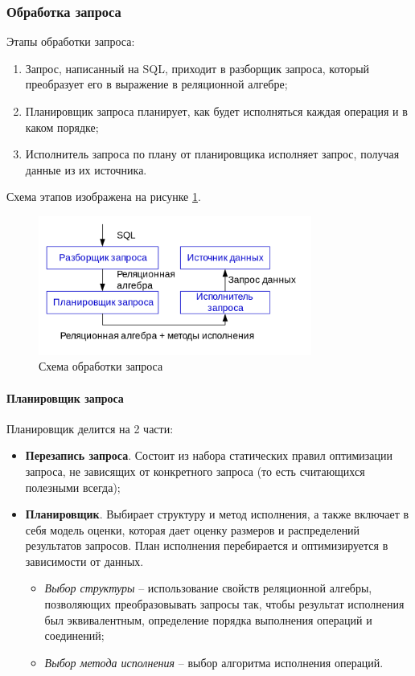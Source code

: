 \subsubsection{Обработка запроса}

Этапы обработки запроса:

\begin{enumerate}
	\item Запрос, написанный на SQL, приходит в разборщик запроса, который преобразует его в выражение в
	      реляционной алгебре;
	\item Планировщик запроса планирует, как будет исполняться каждая операция и в каком порядке;
	\item Исполнитель запроса по плану от планировщика исполняет запрос, получая данные из их источника.
\end{enumerate}

Схема этапов изображена на рисунке \ref{query-structure}.

\begin{figure}[H]
	\centering
	\includegraphics[width=0.8\textwidth]{../assets/kgeorgiy/optimization/Structure_Query.svg.png}
	\caption{Схема обработки запроса}
	\label{query-structure}
\end{figure}

\paragraph{Планировщик запроса}

Планировщик делится на 2 части:

\begin{itemize}
	\item \textbf{Перезапись запроса}. Состоит из набора статических правил оптимизации запроса, не
	      зависящих от конкретного запроса (то есть считающихся полезными всегда);
	\item \textbf{Планировщик}. Выбирает структуру и метод исполнения, а также включает в себя
	      модель оценки, которая дает оценку размеров и распределений результатов запросов. План исполнения
	      перебирается и оптимизируется в зависимости от данных.
	      \begin{itemize}
		      \item \textit{Выбор структуры} -- использование свойств реляционной алгебры,
		            позволяющих преобразовывать запросы так, чтобы результат исполнения был эквивалентным, определение
		            порядка выполнения операций и соединений;
		      \item \textit{Выбор метода исполнения} -- выбор алгоритма исполнения операций.
	      \end{itemize}
\end{itemize}

